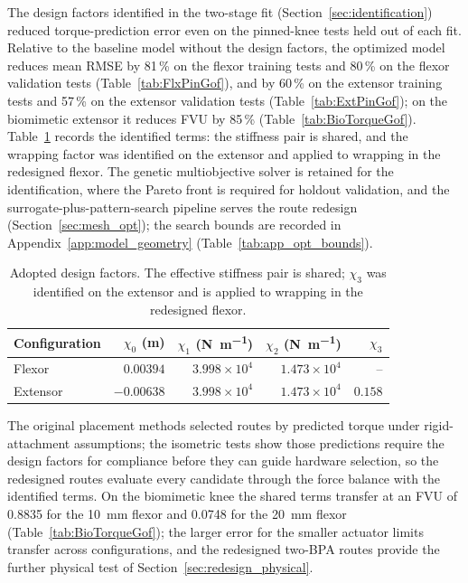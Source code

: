 The design factors identified in the two-stage fit (Section~\ref{sec:identification}) reduced torque-prediction error even on the pinned-knee tests held out of each fit. Relative to the baseline model without the design factors, the optimized model reduces mean RMSE by 81\,\% on the flexor training tests and 80\,\% on the flexor validation tests (Table~\ref{tab:FlxPinGof}), and by 60\,\% on the extensor training tests and 57\,\% on the extensor validation tests (Table~\ref{tab:ExtPinGof}); on the biomimetic extensor it reduces FVU by 85\,\% (Table~\ref{tab:BioTorqueGof}). Table~\ref{tab:AdoptedXi} records the identified terms: the stiffness pair is shared, and the wrapping factor was identified on the extensor and applied to wrapping in the redesigned flexor. The genetic multiobjective solver is retained for the identification, where the Pareto front is required for holdout validation, and the surrogate-plus-pattern-search pipeline serves the route redesign (Section~\ref{sec:mesh_opt}); the search bounds are recorded in Appendix~\ref{app:model_geometry} (Table~\ref{tab:app_opt_bounds}).

\begin{table}[htbp]
\centering\small
\caption{Adopted design factors. The effective stiffness pair is shared; $\chi_3$ was identified on the extensor and is applied to wrapping in the redesigned flexor.}
\label{tab:AdoptedXi}
\begin{tabular}{@{}lrrrr@{}}
\toprule
Configuration & $\chi_{0}$ (\unit{\meter}) & $\chi_{1}$ (\unit{\newton\per\meter}) & $\chi_{2}$ (\unit{\newton\per\meter}) & $\chi_{3}$\\
\midrule
Flexor & $0.00394$ & $3.998\times10^{4}$ & $1.473\times10^{4}$ & --\\
Extensor & $-0.00638$ & $3.998\times10^{4}$ & $1.473\times10^{4}$ & $0.158$\\
\bottomrule
\end{tabular}
\end{table}

The original placement methods selected routes by predicted torque under rigid-attachment assumptions; the isometric tests show those predictions require the design factors for compliance before they can guide hardware selection, so the redesigned routes evaluate every candidate through the force balance with the identified terms. On the biomimetic knee the shared terms transfer at an FVU of 0.8835 for the \qty{10}{\mm} flexor and 0.0748 for the \qty{20}{\mm} flexor (Table~\ref{tab:BioTorqueGof}); the larger error for the smaller actuator limits transfer across configurations, and the redesigned two-BPA routes provide the further physical test of Section~\ref{sec:redesign_physical}.

